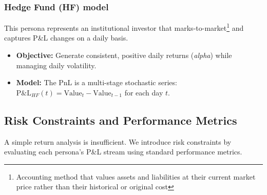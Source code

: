 \documentclass[12pt, a4paper]{article}
\begin{document}
	\subsubsection{Hedge Fund (HF) model}
	This persona represents an institutional investor that marks-to-market\footnote{Accounting method that values assets and liabilities at their current market price rather than their historical or original cost} and captures P\&L changes on a daily basis.
	\begin{itemize}
		\item \textbf{Objective:} Generate consistent, positive daily returns (\textit{alpha}) while managing daily volatility.
		\item \textbf{Model:} The PnL is a multi-stage stochastic series: $\text{P\&L}_{HF}(t) = \text{Value}_t - \text{Value}_{t-1}$ for each day $t$.
	\end{itemize}
	
	
	\subsection{Risk Constraints and Performance Metrics}
	A simple return analysis is insufficient. We introduce risk constraints by evaluating each persona's P\&L stream using standard performance metrics.
	
\end{document}
